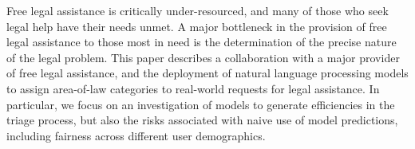 Free legal assistance is critically under-resourced, and many of those who seek legal help have their needs unmet. A major bottleneck in the provision of free legal assistance to those most in need is the determination of the precise nature of the legal problem.  This paper describes a collaboration with a major provider of free legal assistance, and the deployment of natural language processing models to assign area-of-law categories to real-world requests for legal assistance. In particular, we focus on an investigation of models to generate efficiencies in the triage process, but also the risks associated with naive use of model predictions, including fairness across different user demographics.
